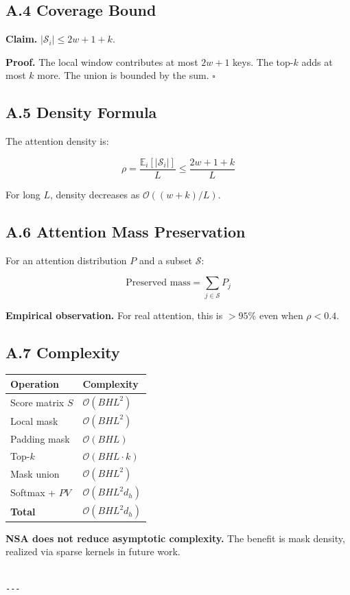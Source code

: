 \subsection{A.4 Coverage Bound}

\textbf{Claim.} $|\mathcal{S}_i| \leq 2w + 1 + k$.

\textbf{Proof.} The local window contributes at most $2w + 1$ keys. The top-$k$ 
adds at most $k$ more. The union is bounded by the sum. $\square$

\subsection{A.5 Density Formula}

The attention density is:

\[
\rho = \frac{\mathbb{E}_i[|\mathcal{S}_i|]}{L} \leq \frac{2w + 1 + k}{L}
\tag{A.2}
\]

For long $L$, density decreases as $\mathcal{O}((w + k) / L)$.

\subsection{A.6 Attention Mass Preservation}

For an attention distribution $P$ and a subset $\mathcal{S}$:

\[
\text{Preserved mass} = \sum_{j \in \mathcal{S}} P_j
\tag{A.3}
\]

\textbf{Empirical observation.} For real attention, this is $> 95\%$ even when 
$\rho < 0.4$.

\subsection{A.7 Complexity}

\begin{table}[H]
\centering
\small
\begin{tabular}{ll}
\toprule
\textbf{Operation} & \textbf{Complexity} \\
\midrule
Score matrix $S$ & $\mathcal{O}(B H L^2)$ \\
Local mask & $\mathcal{O}(B H L^2)$ \\
Padding mask & $\mathcal{O}(B H L)$ \\
Top-$k$ & $\mathcal{O}(B H L \cdot k)$ \\
Mask union & $\mathcal{O}(B H L^2)$ \\
Softmax + $P V$ & $\mathcal{O}(B H L^2 d_h)$ \\
\textbf{Total} & $\mathcal{O}(B H L^2 d_h)$ \\
\bottomrule
\end{tabular}
\end{table}

\textbf{NSA does not reduce asymptotic complexity.} The benefit is mask density, 
realized via sparse kernels in future work.
\begin{lstlisting}

---
\end{lstlisting}